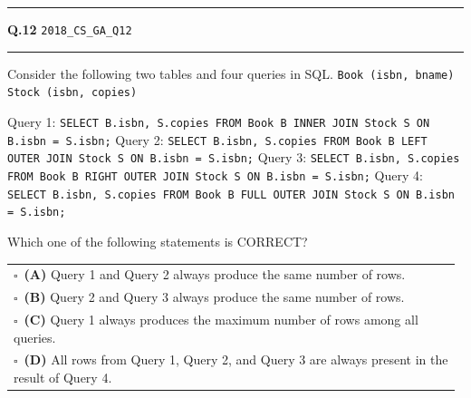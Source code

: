 \documentclass[a4paper,10pt]{article}
\begin{document}
\vspace{6pt}\hrule height 0.35pt\vspace{6pt}
\noindent
\begin{tcolorbox}[
    blanker,
    sidebyside,
    sidebyside align=top,
    lefthand width=0.55\textwidth,
    top=4pt, bottom=4pt, left=0pt, right=0pt,
    middle=16pt,
    underlay={
        \draw[dashed, black!80, line width=0.8pt, dash pattern=on 4pt off 3pt]
            ([xshift=0.55\textwidth+8pt]frame.north west) --
            ([xshift=0.55\textwidth+8pt]frame.south west);
    }
]
\textbf{Q.12}  \hfill {\tiny\texttt{2018\_CS\_GA\_Q12}}
\vspace{2pt}\hrule height 0.3pt\vspace{4pt}

Consider the following two tables and four queries in SQL.
\texttt{Book (isbn, bname)}
\texttt{Stock (isbn, copies)}
\par\medskip
Query 1: \texttt{SELECT B.isbn, S.copies FROM Book B INNER JOIN Stock S ON B.isbn = S.isbn;}
Query 2: \texttt{SELECT B.isbn, S.copies FROM Book B LEFT OUTER JOIN Stock S ON B.isbn = S.isbn;}
Query 3: \texttt{SELECT B.isbn, S.copies FROM Book B RIGHT OUTER JOIN Stock S ON B.isbn = S.isbn;}
Query 4: \texttt{SELECT B.isbn, S.copies FROM Book B FULL OUTER JOIN Stock S ON B.isbn = S.isbn;}
\par\medskip
Which one of the following statements is CORRECT?

\par\vspace{6pt}\noindent
\begin{tabular}{@{}p{0.98\linewidth}@{}}
$\square$\ \textbf{(A)} Query 1 and Query 2 always produce the same number of rows. \\
\addlinespace[3pt]
$\square$\ \textbf{(B)} Query 2 and Query 3 always produce the same number of rows. \\
\addlinespace[3pt]
$\square$\ \textbf{(C)} Query 1 always produces the maximum number of rows among all queries. \\
\addlinespace[3pt]
$\square$\ \textbf{(D)} All rows from Query 1, Query 2, and Query 3 are always present in the result of Query 4.
\end{tabular}

\tcblower


\end{tcolorbox}
\end{document}
